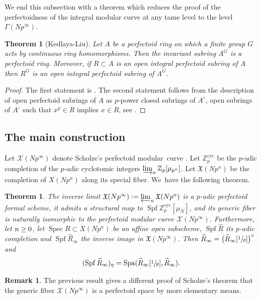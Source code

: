 \documentclass[JEP,XML,SOM,Unicode,published]{cedram}
\newcommand{\cyc}{\mathrm{cyc}}
\numberwithin{equation}{section}
\newtheorem{theo}[prop]{Theorem}
\theoremstyle{definition}
\newtheorem{remark}[prop]{Remark}
\newcommand{\bb}[1]{\mathbb{#1}}
\newcommand{\n}[1]{\mathcal{#1}}
\newcommand{\f}[1]{\mathfrak{#1}}
\DeclareMathOperator{\Spf}{Spf}
\DeclareMathOperator{\Spec}{Spec}
\DeclareMathOperator{\Spa}{Spa}
\newcommand{\mc}[1]{X(Np^{#1})}
\begin{document}
We end this subsection with a theorem which reduces the proof of the perfectoidness of the integral modular curve at any tame level to the level $\Gamma(Np^\infty)$.

\begin{theo}[Kedlaya-Liu]
\label{theoinvperf}
Let $A$ be a perfectoid ring on which a finite group $G$ acts by continuous ring homomorphisms. Then the invariant subring $A^G$ is a perfectoid ring. Moreover, if $R\subset A$ is an open integral perfectoid subring of $A$ then $R^G$ is an open integral perfectoid subring of $A^G$.
\end{theo}

\begin{proof}
The first statement is \cite[Th.\,3.3.26]{kedlaya2016relative}. The second statement follows from the description of open perfectoid subrings of $A$ as $p$-power closed subrings of $A^\circ$, \ie open subrings of $A^\circ$ such that $x^p \in R$ implies $x\in R$, see \cite[Cor.\,2.2]{MorrowFoundPerfectoid}.
\end{proof}

\subsection*{The main construction}

Let $\n{X}(Np^\infty)$ denote Scholze's perfectoid modular~curve \cite{scholzeTorsCoho2015}. Let $\bb{Z}_p^{\cyc}$ be the $p$-adic completion of the $p$-adic cyclotomic integers $\varinjlim_n \bb{Z}_p[\mu_{p^n}]$. Let $\f{X}(Np^n)$ be the completion of $\mc{n}$ along its special fiber. We~have the following theorem.

\begin{theo}
\label{theoexistperfint}
The inverse limit $\f{X}(Np^\infty):=\varprojlim_{n} \f{X}(Np^n)$ is a $p$-adic perfectoid formal scheme, it admits a structural map to $\Spf \bb{Z}_p^{\cyc}[\mu_{N}]$, and its generic fiber is naturally isomorphic to the perfectoid modular curve $\n{X}(Np^\infty)$. Furthermore, let $n\geq\nobreak 0$, let $\Spec R \subset X(Np^n)$ be an affine open subscheme, $\Spf \widehat{R}$ its $p$-adic completion and $\Spf \widehat{R}_{\infty}$ the inverse image in $\f{X}(Np^\infty)$. Then $\widehat{R}_{\infty}= \bigl(\widehat{R}_{\infty}[\sfrac{1}{p}]\bigr)^{\circ}$ and
\[
(\Spf \widehat{R}_{\infty})_{\eta}= \Spa(\widehat{R}_{\infty}[\sfrac{1}{p}], \widehat{R}_{\infty}).
\]
\end{theo}

\begin{remark}
The previous result gives a different proof of Scholze's theorem that the generic fiber $\n{X}(Np^\infty)$ is a perfectoid space by more elementary means.
\end{remark}
\end{document}
